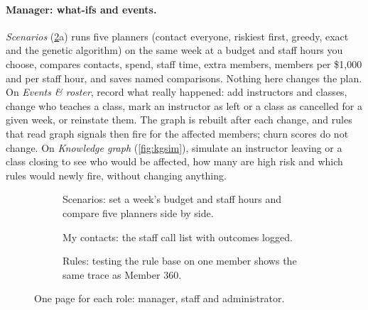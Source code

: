 \documentclass[paper=a4, fontsize=11pt, open=any, parskip=half-,
  headings=small, numbers=noenddot, captions=tableheading, toc=flat]{scrreprt}
\begin{document}
\paragraph{Manager: what-ifs and events.} \emph{Scenarios} (\cref{fig:ug}a) runs five planners (contact everyone, riskiest first, greedy, exact and the genetic algorithm) on the same week at a budget and staff hours you choose, compares contacts, spend, staff time, extra members, members per \$1,000 and per staff hour, and saves named comparisons. Nothing here changes the plan. On \emph{Events \& roster}, record what really happened: add instructors and classes, change who teaches a class, mark an instructor as left or a class as cancelled for a given week, or reinstate them. The graph is rebuilt after each change, and rules that read graph signals then fire for the affected members; churn scores do not change. On \emph{Knowledge graph} (\cref{fig:kgsim}), simulate an instructor leaving or a class closing to see who would be affected, how many are high risk and which rules would newly fire, without changing anything.

\begin{figure}[!htb]
  \centering
  \begin{subfigure}[t]{0.328\linewidth}
    \caption{Scenarios: set a week's budget and staff hours and compare five planners side by side.}
  \end{subfigure}\hfill
  \begin{subfigure}[t]{0.328\linewidth}
    \caption{My contacts: the staff call list with outcomes logged.}
  \end{subfigure}\hfill
  \begin{subfigure}[t]{0.328\linewidth}
    \caption{Rules: testing the rule base on one member shows the same trace as Member 360.}
    \label{fig:rulestrace}
  \end{subfigure}
  \caption{One page for each role: manager, staff and administrator.}
  \label{fig:ug}
\end{figure}
\end{document}
